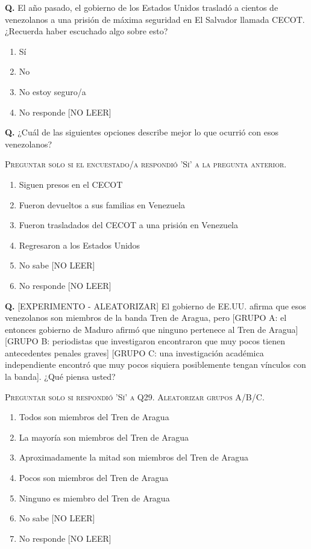 \documentclass[11pt,letterpaper]{article}
\newcounter{question}
\newcommand{\question}[1]{%
  \stepcounter{question}%
  \vspace{0.3em}%
  \noindent\textbf{Q\thequestion.} #1%
}
\newcommand{\instruction}[1]{%
  \vspace{0.1em}%
  \noindent\textsc{\small #1}%
  \vspace{0.1em}%
}
\newenvironment{responses}
{\begin{enumerate}[label=(\arabic*), leftmargin=2em, itemsep=0em, parsep=0em, topsep=0em]}
{\end{enumerate}\vspace{0.3em}}
\begin{document}
\question{El año pasado, el gobierno de los Estados Unidos trasladó a cientos de venezolanos a una prisión de máxima seguridad en El Salvador llamada CECOT. ¿Recuerda haber escuchado algo sobre esto?}
\begin{responses}
\item Sí
\item No
\item No estoy seguro/a
\item[(99)] No responde [NO LEER]
\end{responses}

\question{¿Cuál de las siguientes opciones describe mejor lo que ocurrió con esos venezolanos?}

\instruction{Preguntar solo si el encuestado/a respondió 'Sí' a la pregunta anterior.}
\begin{responses}
\item Siguen presos en el CECOT
\item Fueron devueltos a sus familias en Venezuela
\item Fueron trasladados del CECOT a una prisión en Venezuela
\item Regresaron a los Estados Unidos
\item[(98)] No sabe [NO LEER]
\item[(99)] No responde [NO LEER]
\end{responses}

\question{[EXPERIMENTO - ALEATORIZAR] El gobierno de EE.UU. afirma que esos venezolanos son miembros de la banda Tren de Aragua, pero [GRUPO A: el entonces gobierno de Maduro afirmó que ninguno pertenece al Tren de Aragua] [GRUPO B: periodistas que investigaron encontraron que muy pocos tienen antecedentes penales graves] [GRUPO C: una investigación académica independiente encontró que muy pocos siquiera posiblemente tengan vínculos con la banda]. ¿Qué piensa usted?}

\instruction{Preguntar solo si respondió 'Sí' a Q29. Aleatorizar grupos A/B/C.}
\begin{responses}
\item Todos son miembros del Tren de Aragua
\item La mayoría son miembros del Tren de Aragua
\item Aproximadamente la mitad son miembros del Tren de Aragua
\item Pocos son miembros del Tren de Aragua
\item Ninguno es miembro del Tren de Aragua
\item[(98)] No sabe [NO LEER]
\item[(99)] No responde [NO LEER]
\end{responses}
\end{document}
